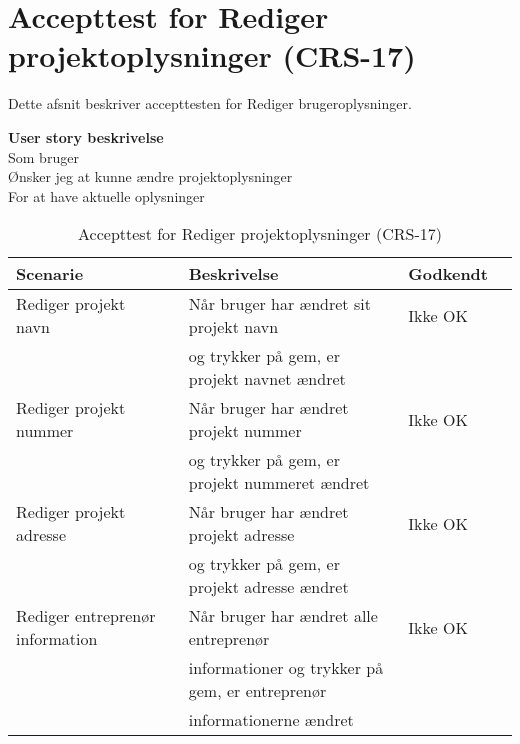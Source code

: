 \section{Accepttest for Rediger projektoplysninger (CRS-17)}
Dette afsnit beskriver accepttesten for Rediger brugeroplysninger.

\textbf{User story beskrivelse} \\
Som bruger \\
Ønsker jeg at kunne ændre projektoplysninger \\
For at have aktuelle oplysninger

\begin{table}[H]
	\centering
	\begin{tabular}{|ll|l|ll|} \hline
		\textbf{Scenarie} &  & \textbf{Beskrivelse}&  \textbf{Godkendt}&  \\ \hline
		Rediger projekt navn&  &  Når bruger har ændret sit projekt navn &  Ikke OK&  \\
		& & og trykker på gem, er projekt navnet ændret& & \\ \hline
		Rediger projekt nummer&  &  Når bruger har ændret projekt nummer &  Ikke OK&  \\
		& & og trykker på gem, er projekt nummeret ændret & & \\ \hline
		Rediger projekt adresse&  &  Når bruger har ændret projekt adresse &  Ikke OK&  \\
		& & og trykker på gem, er projekt adresse ændret& & \\ \hline
		Rediger entreprenør information&  &  Når bruger har ændret alle entreprenør &  Ikke OK&  \\
		& & informationer og trykker på gem, er entreprenør& & \\
		& & informationerne ændret& & \\ \hline
	\end{tabular}
	\caption{Accepttest for Rediger projektoplysninger (CRS-17)}
	\label{AcceptRedigerProjekt}
\end{table}

\clearpage